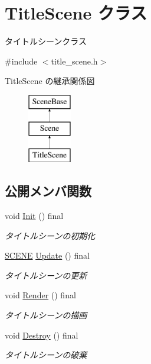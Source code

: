 \hypertarget{class_title_scene}{}\section{Title\+Scene クラス}
\label{class_title_scene}


タイトルシーンクラス  




{\ttfamily \#include $<$title\+\_\+scene.\+h$>$}

Title\+Scene の継承関係図\begin{figure}[H]
\begin{center}
\leavevmode
\includegraphics[height=3.000000cm]{class_title_scene}
\end{center}
\end{figure}
\subsection*{公開メンバ関数}
\begin{DoxyCompactItemize}
\item 
void \mbox{\hyperlink{class_title_scene_a3d039e7db0fa1e22e8c36d3cedfbd318}{Init}} () final
\begin{DoxyCompactList}\small\item\em タイトルシーンの初期化 \end{DoxyCompactList}\item 
\mbox{\hyperlink{scene__base_8h_a24cee5343fb9d0706ead6e8601f363be}{S\+C\+E\+NE}} \mbox{\hyperlink{class_title_scene_a19f6ee49ca6c8526fb1af2c0a2df9a33}{Update}} () final
\begin{DoxyCompactList}\small\item\em タイトルシーンの更新 \end{DoxyCompactList}\item 
void \mbox{\hyperlink{class_title_scene_af12c59b3bf9458640938c5ca620527ae}{Render}} () final
\begin{DoxyCompactList}\small\item\em タイトルシーンの描画 \end{DoxyCompactList}\item 
void \mbox{\hyperlink{class_title_scene_adfbc5f934572ede2e36419b089c88fe8}{Destroy}} () final
\begin{DoxyCompactList}\small\item\em タイトルシーンの破棄 \end{DoxyCompactList}\end{DoxyCompactItemize}

